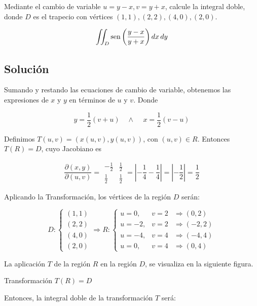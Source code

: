 \documentclass{article}
\begin{document}
\newpage

\item Mediante el cambio de variable $u=y-x, v=y+x$, calcule la integral doble, donde $D$ es el trapecio con vértices $(1,1),(2,2),(4,0), (2,0)$.

$$\iint_D\mathop{\rm sen}\nolimits{\left(\frac{y-x}{y+x}\right)}\,dx\,dy$$\vs

\subsection*{\bf Solución}

Sumando y restando las ecuaciones de cambio de variable, obtenemos las expresiones de $x$ y $y$ en términos de $u$ y $v$. Donde

$$y=\frac12(v+u)\quad\wedge\quad\,x=\frac12(v-u)$$ \vs

Definimos $T(u,v)=(x(u,v),y(u,v))$, con $(u,v)\in R$. Entonces $T(R)=D$, cuyo Jacobiano es \vs

$$\frac{\partial(x,y)}{\partial(u,v)}=\begin{array}{|rc|} -\frac12 & \frac12 \\ \frac12 & \frac12 \end{array}=\left\lvert{-\frac14-\frac14}\right\rvert=\left\lvert{-\frac12}\right\rvert=\frac12$$

\vs

Aplicando la Transformación, los vértices de la región $D$ serán: \vs

$$D: \left\{\begin{array}{l} (1,1)  \\  (2,2) \\ (4,0) \\ (2,0) \end{array} \right. \Longrightarrow R: \left\{\begin{array}{lcl} u=0,  &   v=2 & \Longrightarrow (0,2) \\ u=-2,  &   v=2  & \Longrightarrow (-2,2)\\ u=-4, & v=4 & \Longrightarrow (-4,4)\\ u=0, & v=4 & \Longrightarrow (0,4) \end{array}\right.$$ \vs

La aplicación $T$ de la región $R$ en la región $D$, se visualiza en la siguiente figura. \vs


\bc

{Transformación $T(R)=D$} \ec
\newpage

Entonces, la integral doble de la transformación $T$ será:
\end{document}
